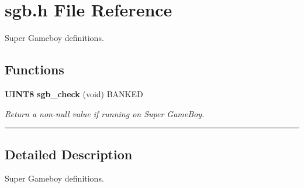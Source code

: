\section{sgb.h File Reference}
\label{sgb.h}
Super Gameboy definitions. 


\subsection*{Functions}
\begin{CompactItemize}
\item 
\label{sgb.h_a0}
{\bf UINT8} {\bf sgb\_\-check} (void) BANKED
\begin{CompactList}\small\item\em Return a non-null value if running on Super Game\-Boy.\item\end{CompactList}

\end{CompactItemize}
\vspace{0.4cm}\hrule\vspace{0.2cm}
\subsection*{Detailed Description}
Super Gameboy definitions.
